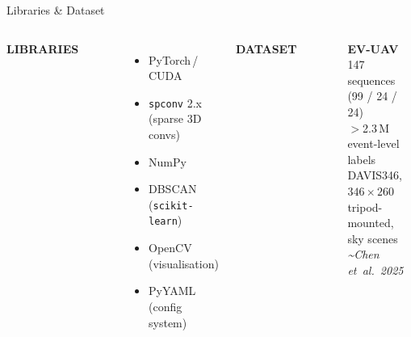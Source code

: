 \documentclass[aspectratio=169,11pt]{beamer}
\newcommand{\srctag}[1]{{\footnotesize\itshape\color{mutedgray}\textasciitilde#1}}
\begin{document}
\begin{frame}{Libraries \& Dataset}
  \vspace{0.3em}
  \begin{columns}[T,onlytextwidth]
    \textbf{\Large LIBRARIES}\\[0.3em]
    \rule{0.95\linewidth}{0.3pt}\\[0.5em]
    \begin{itemize}
      \setlength\itemsep{0.25em}
      \item PyTorch\,/\,CUDA
      \item \texttt{spconv} 2.x (sparse 3D convs)
      \item NumPy
      \item DBSCAN (\texttt{scikit-learn})
      \item OpenCV (visualisation)
      \item PyYAML (config system)
    \end{itemize}

    \textbf{\Large DATASET}\\[0.3em]
    \rule{0.95\linewidth}{0.3pt}\\[0.5em]
    \begin{darkbox}
      \centering
      \textbf{EV-UAV}\\[0.3em]
      147 sequences \;(99 / 24 / 24)\\
      $>$2.3\,M event-level labels\\
      DAVIS346, $346\!\times\!260$\\
      tripod-mounted, sky scenes\\[0.3em]
      \srctag{Chen et~al.\ 2025}
    \end{darkbox}
  \end{columns}
\end{frame}
\end{document}
